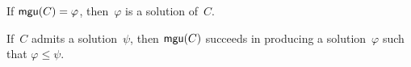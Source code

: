 \begin{prop}
If $\textsf{mgu}(C) = \varphi$, then~$\varphi$ is a solution of~$C$.
\end{prop}

\begin{prop}
If~$C$ admits a solution~$\psi$, then $\textsf{mgu}(C)$ succeeds in producing
a solution~$\varphi$ such that $\varphi \leqslant \psi$.
\end{prop}

